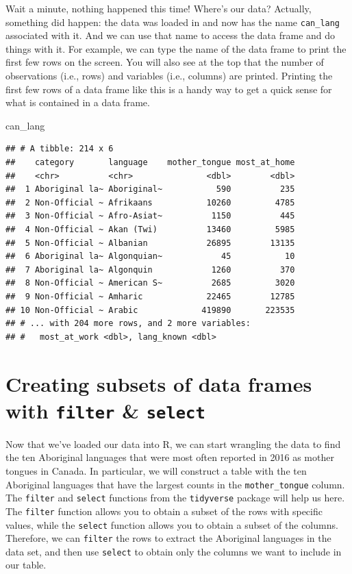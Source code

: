 \documentclass[
  12pt,
]{krantz}
\newenvironment{Shaded}{\begin{snugshade}}{\end{snugshade}}
\newcommand{\NormalTok}[1]{#1}
\begin{document}
Wait a minute, nothing happened this time! Where's our data?
Actually, something did happen: the data was loaded in
and now has the name \texttt{can\_lang} associated with it.
And we can use that name to access the data frame and do things with it.
For example, we can type the name of the data frame to print the first few rows
on the screen. You will also see at the top that the number of observations (i.e., rows) and
variables (i.e., columns) are printed. Printing the first few rows of a data frame
like this is a handy way to get a quick sense for what is contained in a data frame.

\begin{Shaded}
\begin{Highlighting}[]
\NormalTok{can\_lang}
\end{Highlighting}
\end{Shaded}

\begin{verbatim}
## # A tibble: 214 x 6
##    category       language    mother_tongue most_at_home
##    <chr>          <chr>               <dbl>        <dbl>
##  1 Aboriginal la~ Aboriginal~           590          235
##  2 Non-Official ~ Afrikaans           10260         4785
##  3 Non-Official ~ Afro-Asiat~          1150          445
##  4 Non-Official ~ Akan (Twi)          13460         5985
##  5 Non-Official ~ Albanian            26895        13135
##  6 Aboriginal la~ Algonquian~            45           10
##  7 Aboriginal la~ Algonquin            1260          370
##  8 Non-Official ~ American S~          2685         3020
##  9 Non-Official ~ Amharic             22465        12785
## 10 Non-Official ~ Arabic             419890       223535
## # ... with 204 more rows, and 2 more variables:
## #   most_at_work <dbl>, lang_known <dbl>
\end{verbatim}

\hypertarget{creating-subsets-of-data-frames-with-filter-select}{%
\section{\texorpdfstring{Creating subsets of data frames with \texttt{filter} \& \texttt{select}}{Creating subsets of data frames with filter \& select}}\label{creating-subsets-of-data-frames-with-filter-select}}

Now that we've loaded our data into R, we can start wrangling the data to
find the ten Aboriginal languages that were most often reported
in 2016 as mother tongues in Canada. In particular, we will construct
a table with the ten Aboriginal languages that have the largest
counts in the \texttt{mother\_tongue} column.
The \texttt{filter} and \texttt{select} functions from the \texttt{tidyverse} package will help us
here. The \texttt{filter}  function allows you to obtain a subset of the
rows with specific values, while the \texttt{select}  function allows you
to obtain a subset of the columns. Therefore, we can \texttt{filter} the rows to extract the
Aboriginal languages in the data set, and then use \texttt{select} to obtain only the
columns we want to include in our table.
\end{document}
